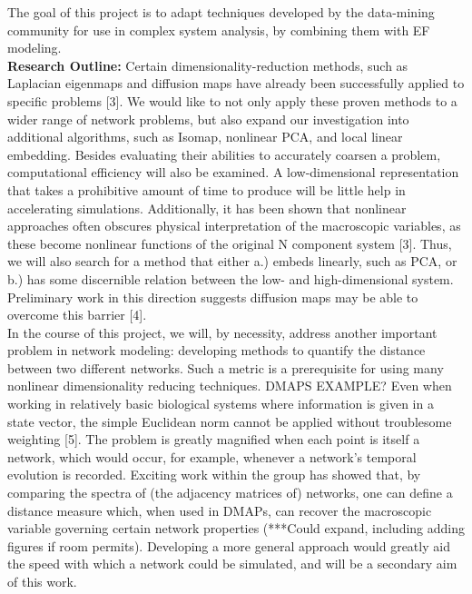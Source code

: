 \documentclass[11pt]{article}
\begin{document}
\indent The goal of this project is to adapt techniques developed by the data-mining community for use in complex system analysis, by combining them with EF modeling.\\
\textbf{Research Outline:}  Certain dimensionality-reduction methods, such as Laplacian eigenmaps and diffusion maps have already been successfully applied to specific problems [3]. We would like to not only apply these proven methods to a wider range of network problems, but also expand our investigation into additional algorithms, such as Isomap, nonlinear PCA, and local linear embedding. Besides evaluating their abilities to accurately coarsen a problem, computational efficiency will also be examined. A low-dimensional representation that takes a prohibitive amount of time to produce will be little help in accelerating simulations. Additionally, it has been shown that nonlinear approaches often obscures physical interpretation of the macroscopic variables, as these become nonlinear functions of the original N component system [3]. Thus, we will also search for a method that either a.) embeds linearly, such as PCA, or b.) has some discernible relation between the low- and high-dimensional system. Preliminary work in this direction suggests diffusion maps may be able to overcome this barrier [4].\\
\indent In the course of this project, we will, by necessity, address another important problem in network modeling: developing methods to quantify the distance between two different networks. Such a metric is a prerequisite for using many nonlinear dimensionality reducing techniques. DMAPS EXAMPLE? Even when working in relatively basic biological systems where information is given in a state vector, the simple Euclidean norm cannot be applied without troublesome weighting [5]. The problem is greatly magnified when each point is itself a network, which would occur, for example, whenever a network's temporal evolution is recorded. Exciting work within the group has showed that, by comparing the spectra of (the adjacency matrices of) networks, one can define a distance measure which, when used in DMAPs, can recover the macroscopic variable governing certain network properties (***Could expand, including adding figures if room permits). Developing a more general approach would greatly aid the speed with which a network could be simulated, and will be a secondary aim of this work.\\
\end{document}
